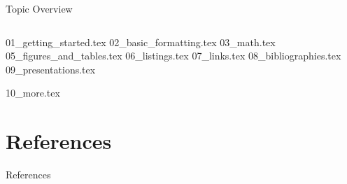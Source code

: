 



\begin{frame}[plain]{Topic Overview}
\begin{columns}[c,onlytextwidth]
\tableofcontents[sections={1-4}]
\tableofcontents[sections={5-8}]
\end{columns}
\end{frame}

{01_getting_started.tex}
{02_basic_formatting.tex}
{03_math.tex}
{05_figures_and_tables.tex}
{06_listings.tex}
{07_links.tex}
{08_bibliographies.tex}
{09_presentations.tex}

\appendix
\beginbackup

{10_more.tex}

\section{References}
\begin{frame}[allowframebreaks]{References}
\printbibliography
\end{frame}

\backupend


